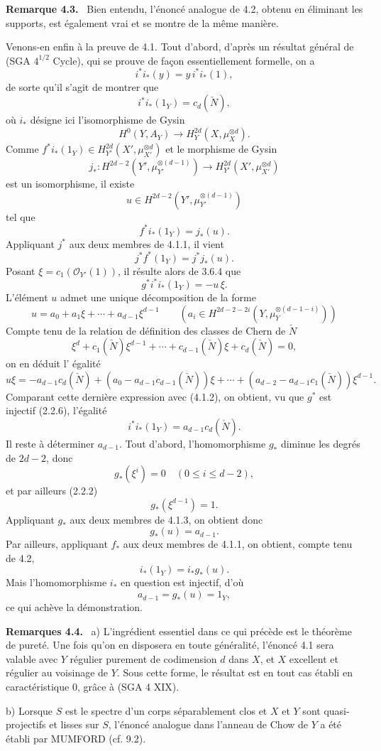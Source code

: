 \documentclass[11pt]{article}
\newenvironment{statement}[1]{\par\medskip\noindent\textbf{#1.}\ }{\par\medskip}
\begin{document}
\begin{statement}{Remarque 4.3}
Bien entendu, l'énoncé analogue de 4.2, obtenu en éliminant les supports, est également vrai et se montre de la même manière.
\end{statement}

Venons-en enfin à la preuve de 4.1. Tout d'abord, d'après un résultat général de (SGA $4^{1/2}$ Cycle), qui se prouve de façon essentiellement formelle, on a
\[
i^*i_*(y)=y\,i^*i_*(1),
\]
de sorte qu'il s'agit de montrer que
\[
i^*i_*(1_Y)=c_d(\check N),
\]
où $i_*$ désigne ici l'isomorphisme de Gysin
\[
H^0(Y,A_Y)\to H_Y^{2d}(X,\mu_X^{\otimes d}).
\]
Comme $f^*i_*(1_Y)\in H_{Y'}^{2d}(X',\mu_{X'}^{\otimes d})$ et le morphisme de Gysin
\[
j_*:H^{2d-2}(Y',\mu_{Y'}^{\otimes(d-1)})
\to H_{Y'}^{2d}(X',\mu_{X'}^{\otimes d})
\]
est un isomorphisme, il existe
\[
u\in H^{2d-2}(Y',\mu_{Y'}^{\otimes(d-1)})
\]
tel que
\[
f^*i_*(1_Y)=j_*(u).
\tag{4.1.1}
\]
Appliquant $j^*$ aux deux membres de 4.1.1, il vient
\[
j^*f^*(1_Y)=j^*j_*(u).
\]
Posant $\xi=c_1(\mathcal O_{Y'}(1))$, il résulte alors de 3.6.4 que
\[
g^*i^*i_*(1_Y)=-u\,\xi.
\tag{4.1.2}
\]
L'élément $u$ admet une unique décomposition de la forme
\[
u=a_0+a_1\xi+\cdots+a_{d-1}\xi^{d-1}
\qquad
(a_i\in H^{2d-2-2i}(Y,\mu_Y^{\otimes(d-1-i)}))
\tag{4.1.3}
\]
Compte tenu de la relation de définition des classes de Chern de $\check N$
\[
\xi^d+c_1(\check N)\xi^{d-1}+\cdots+c_{d-1}(\check N)\xi+c_d(\check N)=0,
\tag{4.1.4}
\]
on en déduit l'%
égalité
\[
u\xi=-a_{d-1}c_d(\check N)+(a_0-a_{d-1}c_{d-1}(\check N))\xi
+\cdots+(a_{d-2}-a_{d-1}c_1(\check N))\xi^{d-1}.
\]
Comparant cette dernière expression avec (4.1.2), on obtient, vu que $g^*$ est injectif (2.2.6), l'égalité
\[
i^*i_*(1_Y)=a_{d-1}c_d(\check N).
\tag{4.1.5}
\]
Il reste à déterminer $a_{d-1}$. Tout d'abord, l'homomorphisme $g_*$ diminue les degrés de $2d-2$, donc
\[
g_*(\xi^i)=0\quad(0\le i\le d-2),
\]
et par ailleurs (2.2.2)
\[
g_*(\xi^{d-1})=1.
\]
Appliquant $g_*$ aux deux membres de 4.1.3, on obtient donc
\[
g_*(u)=a_{d-1}.
\tag{4.1.6}
\]
Par ailleurs, appliquant $f_*$ aux deux membres de 4.1.1, on obtient, compte tenu de 4.2,
\[
i_*(1_Y)=i_*g_*(u).
\tag{4.1.7}
\]
Mais l'homomorphisme $i_*$ en question est injectif, d'où
\[
a_{d-1}=g_*(u)=1_Y,
\]
ce qui achève la démonstration.

\begin{statement}{Remarques 4.4}
a) L'ingrédient essentiel dans ce qui précède est le théorème de pureté. Une fois qu'on en disposera en toute généralité, l'énoncé 4.1 sera valable avec $Y$ régulier purement de codimension $d$ dans $X$, et $X$ excellent et régulier au voisinage de $Y$. Sous cette forme, le résultat est en tout cas établi en caractéristique $0$, grâce à (SGA 4 XIX).

b) Lorsque $S$ est le spectre d'un corps séparablement clos et $X$ et $Y$
sont quasi-projectifs et lisses sur $S$, l'énoncé analogue dans l'anneau de Chow de $Y$ a été établi par MUMFORD (cf. 9.2).
\end{statement}
\end{document}
